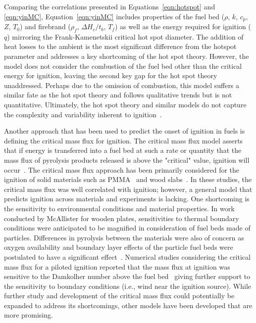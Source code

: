     Comparing the correlations presented in Equations~\ref{eqn:hotspot} and \ref{eqn:yinMC}, Equation~\ref{eqn:yinMC} includes properties of the fuel bed ($\rho$, $k$, $c_p$, $Z$, $T_0$) and  firebrand ($\rho_f$, $\Delta H_c/t_b$, $T_f$) as well as the energy required for ignition ($q$) mirroring the Frank-Kamenetskii critical hot spot diameter. The addition of heat losses to the ambient is the most significant difference from the hotspot parameter and addresses a key shortcoming of the hot spot theory. However, the model does not consider the combustion of the fuel bed other than the critical energy for ignition, leaving the second key gap for the hot spot theory unaddressed. Perhaps due to the omission of combustion, this model suffers a similar fate as the hot spot theory and follows qualitative trends but is not quantitative. Ultimately, the hot spot theory and similar models do not capture the complexity and variability inherent to ignition~\cite{Manzello2020}. 
    
    Another approach that has been used to predict the onset of ignition in fuels is defining the critical mass flux for ignition. The critical mass flux model asserts that if energy is transferred into a fuel bed at such a rate or quantity that the mass flux of pyrolysis products released is above the "critical" value, ignition will occur~\cite{Nelson1995}. The critical mass flux approach has been primarily considered for the ignition of solid materials such as PMMA~\cite{Rich2007} and wood slabs~\cite{Yashwanth2015, McAllister2013}. In these studies, the critical mass flux was well correlated with ignition; however, a general model that predicts ignition across materials and experiments is lacking. One shortcoming is the sensitivity to environmental conditions and material properties. In work conducted by McAllister for wooden plates, sensitivities to thermal boundary conditions were anticipated to be magnified in consideration of fuel beds made of particles. Differences in pyrolysis between the materials were also of concern as oxygen availability and boundary layer effects of the particle fuel beds were postulated to have a significant effect~\cite{McAllister2013}. Numerical studies considering the critical mass flux for a piloted ignition reported that the mass flux at ignition was sensitive to the Damkolher number above the fuel bed~\cite{Dai2013} giving further support to the sensitivity to boundary conditions (i.e., wind near the ignition source). While further study and development of the critical mass flux could potentially be expanded to address its shortcomings, other models have been developed that are more promising.
    
